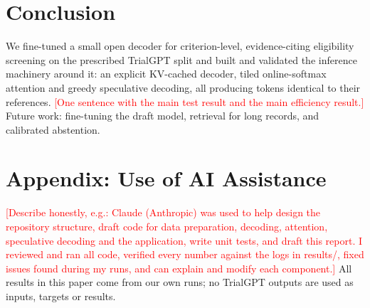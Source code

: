 \documentclass[conference]{IEEEtran}
\newcommand{\fillin}[1]{\textcolor{red}{[#1]}}
\begin{document}
\section{Conclusion}
We fine-tuned a small open decoder for criterion-level, evidence-citing eligibility screening on the prescribed TrialGPT split and built and validated the inference machinery around it: an explicit KV-cached decoder, tiled online-softmax attention and greedy speculative decoding, all producing tokens identical to their references. \fillin{One sentence with the main test result and the main efficiency result.} Future work: fine-tuning the draft model, retrieval for long records, and calibrated abstention.

\section*{Appendix: Use of AI Assistance}
\fillin{Describe honestly, e.g.: Claude (Anthropic) was used to help design the repository structure, draft code for data preparation, decoding, attention, speculative decoding and the application, write unit tests, and draft this report. I reviewed and ran all code, verified every number against the logs in results/, fixed issues found during my runs, and can explain and modify each component.} All results in this paper come from our own runs; no TrialGPT outputs are used as inputs, targets or results.



\end{document}
